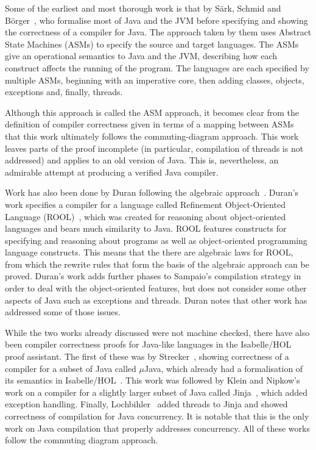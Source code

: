 \documentclass[a4paper,10pt]{report}
\begin{document}
Some of the earliest and most thorough work is that by S\"{a}rk, Schmid and
B\"{o}rger~\cite{stark2001}, who formalise most of Java and the JVM before
specifying and showing the correctness of a compiler for Java.  The approach
taken by them uses Abstract State Machines (ASMs) to specify the source and
target languages.  The ASMs give an operational semantics to Java and the JVM,
describing how each construct affects the running of the program.  The languages
are each specified by multiple ASMs, beginning with an imperative core, then
adding classes, objects, exceptions and, finally, threads.

Although this approach is called the ASM approach, it becomes clear from the
definition of compiler correctness given in terms of a mapping between ASMs that
this work ultimately follows the commuting-diagram approach.  This work leaves
parts of the proof incomplete (in particular, compilation of threads is not
addressed) and applies to an old version of Java.  This is, nevertheless, an
admirable attempt at producing a verified Java compiler.

Work has also been done by Duran following the algebraic
approach~\cite{duran2005, duran2010}.  Duran's work specifies a compiler for a
language called Refinement Object-Oriented Language (ROOL)~\cite{borba2000},
which was created for reasoning about object-oriented languages and bears much
similarity to Java.  ROOL features constructs for specifying and reasoning about
programs as well as object-oriented programming language constructs.  This means
that the there are algebraic laws for ROOL, from which the rewrite rules that
form the basis of the algebraic approach can be proved.  Duran's work adds
further phases to Sampaio's compilation strategy in order to deal with the
object-oriented features, but does not consider some other aspects of Java such
as exceptions and threads.  Duran notes that other work has addressed some of
those issues.

While the two works already discussed were not machine checked, there have also
been compiler correctness proofs for Java-like languages in the Isabelle/HOL
proof assistant.  The first of these was by Strecker~\cite{strecker2002},
showing correctness of a compiler for a subset of Java called $\mu$Java, which
already had a formalisation of its semantics in Isabelle/HOL~\cite{nipkow2000}.
This work was followed by Klein and Nipkow's work on a compiler for a slightly
larger subset of Java called Jinja~\cite{klein2006}, which added exception
handling.  Finally, Lochbihler~\cite{lochbihler2010} added threads to Jinja and
showed correctness of compilation for Java concurrency.  It is notable that this
is the only work on Java compilation that properly addresses concurrency.  All
of these works follow the commuting diagram approach.
\end{document}
